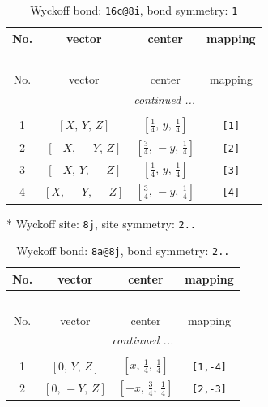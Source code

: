 \documentclass[fleqn,8pt]{jsarticle}
\begin{document}
\begin{longtable}{cccc}
\caption{Wyckoff bond: {\tt 16c@8i}, bond symmetry: {\tt 1}}
 \\
 \hline \hline
No. & vector & center & mapping \\ \hline \endfirsthead

\multicolumn{3}{l}{\tablename\ \thetable{}} \\
 \hline \hline
No. & vector & center & mapping \\ \hline \endhead

 \hline \hline
\multicolumn{3}{r}{\footnotesize\it continued ...} \\ \endfoot

 \hline \hline
\multicolumn{3}{r}{} \\ \endlastfoot

1 & $\left[ X,\, Y,\, Z \right]$ & $\left[ \frac{1}{4},\, y,\, \frac{1}{4} \right]$ & {\tt [1]} \\ \hline
2 & $\left[ - X,\, - Y,\, Z \right]$ & $\left[ \frac{3}{4},\, - y,\, \frac{1}{4} \right]$ & {\tt [2]} \\ \hline
3 & $\left[ - X,\, Y,\, - Z \right]$ & $\left[ \frac{1}{4},\, y,\, \frac{1}{4} \right]$ & {\tt [3]} \\ \hline
4 & $\left[ X,\, - Y,\, - Z \right]$ & $\left[ \frac{3}{4},\, - y,\, \frac{1}{4} \right]$ & {\tt [4]} \\
\end{longtable}
* Wyckoff site: {\tt 8j}, site symmetry: {\tt 2..}
\renewcommand{\arraystretch}{1.2}
\begin{longtable}{cccc}
\caption{Wyckoff bond: {\tt 8a@8j}, bond symmetry: {\tt 2..}}
 \\
 \hline \hline
No. & vector & center & mapping \\ \hline \endfirsthead

\multicolumn{3}{l}{\tablename\ \thetable{}} \\
 \hline \hline
No. & vector & center & mapping \\ \hline \endhead

 \hline \hline
\multicolumn{3}{r}{\footnotesize\it continued ...} \\ \endfoot

 \hline \hline
\multicolumn{3}{r}{} \\ \endlastfoot

1 & $\left[ 0,\, Y,\, Z \right]$ & $\left[ x,\, \frac{1}{4},\, \frac{1}{4} \right]$ & {\tt [1,-4]} \\ \hline
2 & $\left[ 0,\, - Y,\, Z \right]$ & $\left[ - x,\, \frac{3}{4},\, \frac{1}{4} \right]$ & {\tt [2,-3]} \\
\end{longtable}
\end{document}
